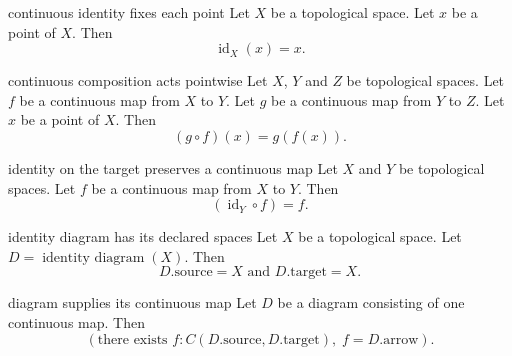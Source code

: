 \begin{cleanresult}{continuous identity fixes each point}
Let $X$ be a topological space.
Let $x$ be a point of $X$.
Then \[\operatorname{id}_{X}(x)=x.\]
\par{}
\end{cleanresult}

\begin{cleanresult}{continuous composition acts pointwise}
Let $X$, $Y$ and $Z$ be topological spaces.
Let $f$ be a continuous map from $X$ to $Y$.
Let $g$ be a continuous map from $Y$ to $Z$.
Let $x$ be a point of $X$.
Then \[\left(g \circ f\right)(x)=g(f(x)).\]
\par{}
\end{cleanresult}

\begin{cleanresult}{identity on the target preserves a continuous map}
Let $X$ and $Y$ be topological spaces.
Let $f$ be a continuous map from $X$ to $Y$.
Then \[\left(\operatorname{id}_{Y} \circ f\right)=f.\]
\par{}
\end{cleanresult}

\begin{cleanresult}{identity diagram has its declared spaces}
Let $X$ be a topological space.
Let $D = \operatorname{identity\ diagram}(X)$.
Then \[D.\mathrm{source}=X\text{ and }D.\mathrm{target}=X.\]
\end{cleanresult}

\begin{cleanresult}{diagram supplies its continuous map}
Let $D$ be a diagram consisting of one continuous map.
Then \[\left(\text{there exists }f : C(D.\mathrm{source},D.\mathrm{target}),\; f=D.\mathrm{arrow}\right).\]
\end{cleanresult}

